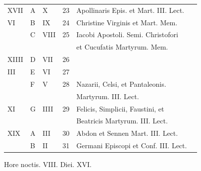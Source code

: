 \begin{center}
\begin{tabular}{l | l | l | r | l l}
\color{Red} XVII & \color{Red} A & \color{Red} X & 23 & \color{Red} Apollinaris Epis. et Mart. III. Lect. \\
\color{Red} VI & B & \color{Red} IX & 24 & Christine Virginis et Mart. Mem. \\
\color{Red}  & C & \color{Red} VIII & 25 & \multicolumn{2}{l}{Iacobi Apostoli. Semi. \quad Christofori } \\
 &  &  &  & \quad et Cucufatis Martyrum. Mem. \\
\color{Red} XIIII & D & \color{Red} VII & 26 & & \color{Red} \\
\color{Red} III & E & \color{Red} VI & 27 & & \color{Red} \\
\color{Red}  & F & \color{Red} V & 28 & \multicolumn{2}{l}{Nazarii, Celsi, et Pantaleonis.} \\
 &  &  &  & \quad Martyrum. III. Lect. \color{Red} \\
\color{Red} XI & G & \color{Red} IIII & 29 & \multicolumn{2}{l}{\color{Red} Felicis, Simplicii, Faustini, et} \\
 &  &  &  & \quad \color{Red} Beatricis Martyrum. III. Lect. \\
\color{Red} XIX & \color{Red} A & \color{Red} III & 30 & Abdon et Sennen Mart. III. Lect. & \color{Red} \\
\color{Red}  & B & \color{Red} II & 31 & Germani Episcopi et Conf. III. Lect. & \color{Red} \\
\end{tabular}
\newline \color{Red} Hore noctis. VIII. Diei. XVI.
\end{center}



\newpage
\color{Red}\color{black}

